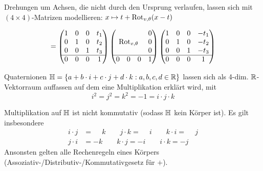 
\begin{bem}
	Drehungen um Achsen, die nicht durch den Ursprung verlaufen, lassen sich mit $(4 \times
	4)$-Matrizen modellieren: $x \mapsto t + \operatorname{Rot}_{v,\theta} (x-t)$

\begin{center}
\end{center}
$$
	=
	\begin{pmatrix}
		1 & 0 & 0 & t_1\\
		0 & 1 & 0 & t_2\\
		0 & 0 & 1 & t_3\\\hline
		0 & 0 & 0 & 1\\
	\end{pmatrix}
	\begin{pmatrix}
		& & & 0\\
		\multicolumn{3}{c}{\Rot_{v,\theta}} & 0\\
		& & & 0\\\hline
		0 & 0 & 0 & 1
	\end{pmatrix}
	\begin{pmatrix}
		1 & 0 & 0 & -t_1\\
		0 & 1 & 0 & -t_2\\
		0 & 0 & 1 & -t_3\\\hline
		0 & 0 & 0 & 1\\
	\end{pmatrix}
$$
\end{bem}

\begin{defi}
	Quaternionen $\mathbb H = \left\{ a+b \cdot i+c \cdot j+d \cdot k : a,b,c,d \in \mathbb R \right\}$ lassen
	sich als 4-dim. $\mathbb R$-Vektorraum auffassen auf dem eine Multiplikation erklärt wird, mit
	$$
		i^2 = j^2 = k^2 = -1 = i \cdot j \cdot k
	$$
\end{defi}

\begin{bem}
	Multiplikation auf $\mathbb H$ ist nicht kommutativ (sodass $\mathbb H$ kein Körper ist). Es gilt insbesondere
	\begin{align*}
			i \cdot j & = \phantom{-}k \qquad j \cdot k = \phantom{-}i \qquad
				k \cdot i = \phantom{-}j\\
			j \cdot i & = -k \qquad k \cdot j = -i \qquad i \cdot k = -j
	\end{align*}
	Ansonsten gelten alle Rechenregeln eines Körpers (Assoziativ-/Distributiv-/Kommutativgesetz für
	$+$).
\end{bem}

